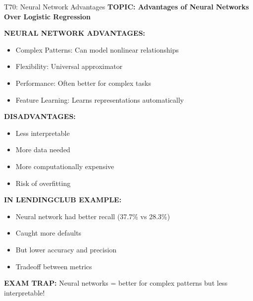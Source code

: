 \documentclass[8pt]{beamer}
\begin{document}
	\begin{frame}{T70: Neural Network Advantages}
		\fontsize{6.5}{7.5}\selectfont
		\textbf{TOPIC: Advantages of Neural Networks Over Logistic Regression}
		
		\vspace{0.1cm}
		\textbf{NEURAL NETWORK ADVANTAGES:}
		\begin{itemize}
			\item \textcolor{myblue}{Complex Patterns:} Can model nonlinear relationships
			\item \textcolor{myblue}{Flexibility:} Universal approximator
			\item \textcolor{myblue}{Performance:} Often better for complex tasks
			\item \textcolor{myblue}{Feature Learning:} Learns representations automatically
		\end{itemize}
		
		\vspace{0.1cm}
		\textbf{DISADVANTAGES:}
		\begin{itemize}
			\item Less interpretable
			\item More data needed
			\item More computationally expensive
			\item Risk of overfitting
		\end{itemize}
		
		\vspace{0.1cm}
		\textbf{IN LENDINGCLUB EXAMPLE:}
		\begin{itemize}
			\item Neural network had better recall (37.7\% vs 28.3\%)
			\item Caught more defaults
			\item But lower accuracy and precision
			\item Tradeoff between metrics
		\end{itemize}
		
		\textcolor{myred}{\textbf{EXAM TRAP:}} Neural networks = \textcolor{myblue}{better for complex patterns} but less interpretable!
	\end{frame}
	
\end{document}
